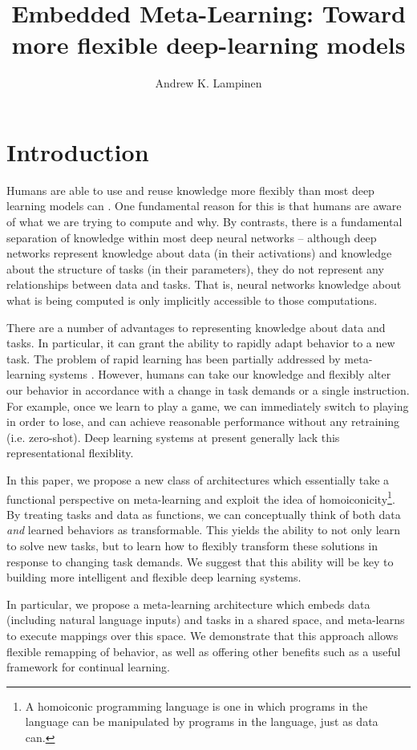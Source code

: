 \documentclass{article}
\begin{document}
\title{Embedded Meta-Learning: Toward more flexible deep-learning models}
\author{Andrew K. Lampinen}
\date{}
\maketitle

\section{Introduction}
Humans are able to use and reuse knowledge more flexibly than most deep learning models can \citep[e.g.][]{Lake2016}. One fundamental reason for this is that humans are aware of what we are trying to compute and why. By contrasts, there is a fundamental separation of knowledge within most deep neural networks -- although deep networks represent knowledge about data (in their activations) and knowledge about the structure of tasks (in their parameters), they do not represent any relationships between data and tasks. That is, neural networks knowledge about what is being computed is only implicitly accessible to those computations. \par
There are a number of advantages to representing knowledge about data and tasks. In particular, it can grant the ability to rapidly adapt behavior to a new task. The problem of rapid learning has been partially addressed by meta-learning systems \citep{?????}. However, humans can take our knowledge and flexibly alter our behavior in accordance with a change in task demands or a single instruction. For example, once we learn to play a game, we can immediately switch to playing in order to lose, and can achieve reasonable performance without any retraining (i.e. zero-shot). Deep learning systems at present generally lack this representational flexiblity. \par
In this paper, we propose a new class of architectures which essentially take a functional perspective on meta-learning and exploit the idea of homoiconicity\footnote{A homoiconic programming language is one in which programs in the language can be manipulated by programs in the language, just as data can.}. By treating tasks and data as functions, we can conceptually think of both data \emph{and} learned behaviors as transformable. This yields the ability to not only learn to solve new tasks, but to learn how to flexibly transform these solutions in response to changing task demands. We suggest that this ability will be key to building more intelligent and flexible deep learning systems. \par
In particular, we propose a meta-learning architecture which embeds data (including natural language inputs) and tasks in a shared space, and meta-learns to execute mappings over this space. We demonstrate that this approach allows flexible remapping of behavior, as well as offering other benefits such as a useful framework for continual learning. \par
\end{document}
